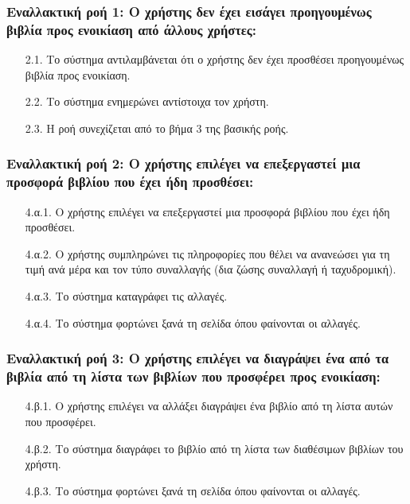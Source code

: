 \documentclass[12pt,a4paper]{article}
\begin{document}
\subsubsection*{Εναλλακτική ροή 1: Ο χρήστης δεν έχει εισάγει προηγουμένως βιβλία προς ενοικίαση από άλλους χρήστες:}
\begin{enumerate}
    \item [2.1.] Το σύστημα αντιλαμβάνεται ότι ο χρήστης δεν έχει προσθέσει προηγουμένως βιβλία προς ενοικίαση.
    \item [2.2.] Το σύστημα ενημερώνει αντίστοιχα τον χρήστη.
    \item [2.3.] Η ροή συνεχίζεται από το βήμα 3 της βασικής ροής.
\end{enumerate}

\subsubsection*{Εναλλακτική ροή 2: Ο χρήστης επιλέγει να επεξεργαστεί μια προσφορά βιβλίου που έχει ήδη προσθέσει:}
\begin{enumerate}
    \item [4.α.1.] Ο χρήστης επιλέγει να επεξεργαστεί μια προσφορά βιβλίου που έχει ήδη προσθέσει.
    \item [4.α.2.] Ο χρήστης συμπληρώνει τις πληροφορίες που θέλει να ανανεώσει για τη τιμή ανά μέρα και τον τύπο συναλλαγής (δια ζώσης συναλλαγή ή ταχυδρομική).
    \item [4.α.3.] Το σύστημα καταγράφει τις αλλαγές.
    \item [4.α.4.] Το σύστημα φορτώνει ξανά τη σελίδα όπου φαίνονται οι αλλαγές.
\end{enumerate}

\subsubsection*{Εναλλακτική ροή 3: Ο χρήστης επιλέγει να διαγράψει ένα από τα βιβλία από τη λίστα των βιβλίων που προσφέρει προς ενοικίαση:}
\begin{enumerate}
    \item [4.β.1.] Ο χρήστης επιλέγει να αλλάξει διαγράψει ένα βιβλίο από τη λίστα αυτών που προσφέρει.
    \item [4.β.2.] Το σύστημα διαγράφει το βιβλίο από τη λίστα των διαθέσιμων βιβλίων του χρήστη.
    \item [4.β.3.] Το σύστημα φορτώνει ξανά τη σελίδα όπου φαίνονται οι αλλαγές.
\end{enumerate}
\end{document}

